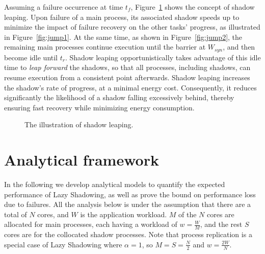 Assuming a failure occurrence at time $t_f$, Figure~\ref{fig:leap} shows the concept of shadow leaping. 
Upon failure of a main process, its associated shadow speeds up to minimize the impact of failure recovery on the other tasks' progress, as illustrated in Figure~\ref{fig:jump1}. 
At the same time, as shown in Figure~\ref{fig:jump2}, the remaining main processes continue execution until the barrier at $W_{syn}$, and then become idle until $t_r$. 
Shadow leaping opportunistically takes advantage of this idle time to {\it leap forward} the shadows, so that  
all processes, including shadows, can resume execution from a consistent point afterwards. 
Shadow leaping increases the shadow's rate of progress, at a minimal energy cost. Consequently, it reduces significantly the likelihood of a shadow falling excessively behind, thereby ensuring fast recovery while minimizing energy consumption.

\begin{figure}[!t]
	\begin{center}
	\end{center}
	\caption{The illustration of shadow leaping.}
	\label{fig:leap}
\end{figure}

\section{Analytical framework}

In the following we develop analytical models to quantify the expected performance of Lazy Shadowing, as well as prove the bound on performance loss due to failures. 
All the analysis below is under the assumption that there are a total of $N$ cores, and $W$ is the application workload.  
$M$ of the $N$ cores are allocated for main processes, each having a workload of $w=\frac{W}{M}$, and the rest $S$ cores are for the collocated shadow processes. %
Note that process replication is a special case of Lazy Shadowing where $\alpha=1$, so 
$M=S=\frac{N}{2}$ and $w=\frac{2W}{N}$. 

